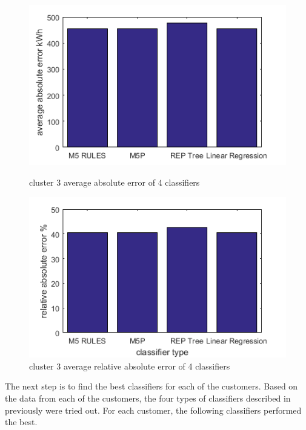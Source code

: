 \begin{figure}
\centering
\begin{minipage}{.5\textwidth}
  \centering
  \includegraphics[width=\linewidth]{cluster-3-diff-classifier-avg-abs.png}
  \caption{cluster 3 average absolute error of 4 classifiers}
  \label{fig:cluster-3-predictors}
\end{minipage}%
\begin{minipage}{.5\textwidth}
  \centering
  \includegraphics[width=\linewidth]{cluster-3-diff-classifier-relative-abs.png}
  \caption{cluster 3 average relative absolute error of 4 classifiers}
\end{minipage}

\end{figure}

The next step is to find the best classifiers for each of the customers. Based on the data from each of the customers, the four types of classifiers described in previously were tried out. For each customer, the following classifiers performed the best. 


